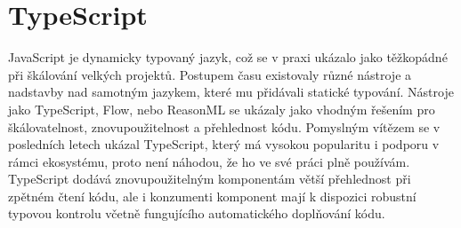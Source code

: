 





\section{TypeScript}

JavaScript je dynamicky typovaný jazyk, což se v praxi ukázalo jako těžkopádné při škálování velkých projektů.
Postupem času existovaly různé nástroje a nadstavby nad samotným jazykem, které mu přidávali statické typování.
Nástroje jako TypeScript, Flow, nebo ReasonML se ukázaly jako vhodným řešením pro škálovatelnost, znovupoužitelnost a přehlednost kódu.
Pomyslným vítězem se v posledních letech ukázal TypeScript, který má vysokou popularitu i podporu v rámci ekosystému, proto není náhodou, že ho ve své práci plně používám.
TypeScript dodává znovupoužitelným komponentám větší přehlednost při zpětném čtení kódu, ale i konzumenti komponent mají k dispozici robustní typovou kontrolu včetně fungujícího automatického doplňování kódu.

